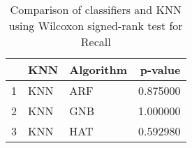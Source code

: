 \begin{table}
\footnotesize
\caption{Comparison of classifiers and KNN using Wilcoxon signed-rank test for Recall}
\label{tab:KNN wilcoxon Recall comparison}
\begin{tabular}{lllr}
\hline
 & KNN & Algorithm & p-value \\
\hline
1 & KNN & ARF & 0.875000 \\
2 & KNN & GNB & 1.000000 \\
3 & KNN & HAT & 0.592980 \\
\hline
\end{tabular}
\end{table}
